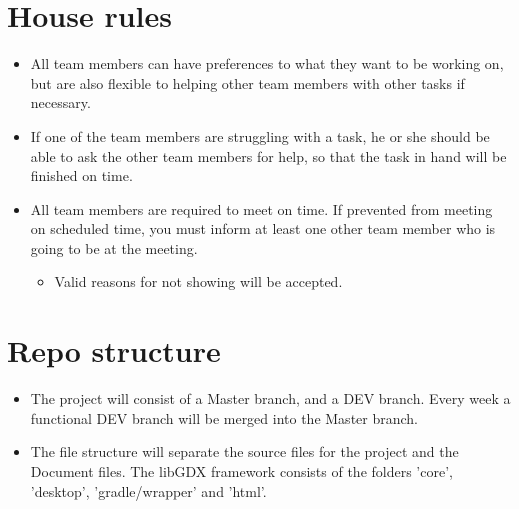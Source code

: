 \documentclass{article}
\begin{document}
\newpage
\section*{House rules}
\begin{itemize}
\item All team members can have preferences to what they want to be working on, but are also flexible to helping other team members with other tasks if necessary.
\item If one of the team members are struggling with a task, he or she should be able to ask the other team members for help, so that the task in hand will be finished on time.
\item All team members are required to meet on time. If prevented from meeting on scheduled time, you must inform at least one other team member who is going to be at the meeting.
	\begin{itemize}
	\item Valid reasons for not showing will be accepted.
	\end{itemize}
\end{itemize}
\section*{Repo structure}
\begin{itemize}
\item The project will consist of a Master branch, and a DEV branch. Every week a functional DEV branch will be merged into the Master branch.
\item The file structure will separate the source files for the project and the Document files. The libGDX framework consists of the folders 'core', 'desktop', 'gradle/wrapper' and 'html'.
\end{itemize}
\end{document}
